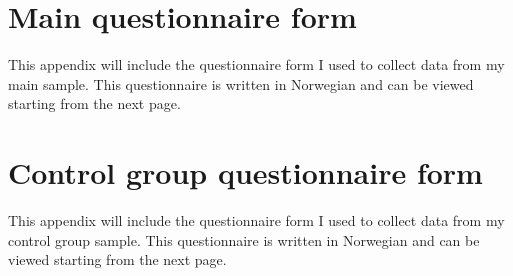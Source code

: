 

\chapter{Main questionnaire form}
\label{app:questionnaire_form}
This appendix will include the questionnaire form I used to collect data from my main sample. This questionnaire is written in Norwegian and can be viewed starting from the next page. 


\chapter{Control group questionnaire form}
\label{app:controlgroup_questionnaire_form}
This appendix will include the questionnaire form I used to collect data from my control group sample. This questionnaire is written in Norwegian and can be viewed starting from the next page.


\begin{comment}
\chapter{Additional Material}
Additional material that does not fit in the main thesis but may still be relevant to share, e.g., raw data from experiments and surveys, code listings, additional plots, pre-project reports, project agreements, contracts, logs etc., can be put in appendices. Simply issue the command \texttt{\textbackslash appendix} in the main \texttt{.tex} file, and make one chapter per appendix.

If the appendix is in the form of a ready-made PDF file, it should be supported by a small descriptive text, and included using the \texttt{pdfpages} package. To illustrate how it works, a standard project agreement (for the IE faculty at NTNU in Gjøvik) is attached here. You would probably want the included PDF file to begin on an odd (right hand) page, which is achieved by using the \texttt{\textbackslash cleardoublepage} command immediately before the \texttt{\textbackslash includepdf[]\{\}} command. Use the option \texttt{[pages=-]} to include all pages of the PDF document, or, e.g., \texttt{[pages=2-4]} to include only the given page range.

\cleardoublepage

\end{comment}